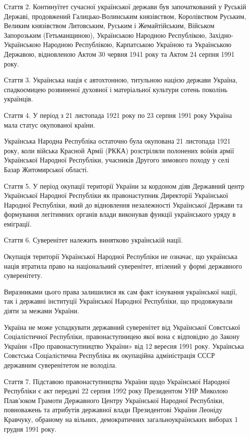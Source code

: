 Стаття 2. Континуїтет сучасної української держави був започаткований у Руській
Державі, продовжений Галицько-Волинським князівством, Королівством Руським,
Великим князівством Литовським, Руським і Жемайтійським, Військом Запорозьким
(Гетьманщиною), Українською Народною Республікою, Західно-Українською Народною
Республікою, Карпатською Україною та Українською Державою, відновленою Актом 30
червня 1941 року та Актом 24 серпня 1991 року.

Стаття 3. Українська нація є автохтонною, титульною нацією держави Україна,
спадкоємицею розвиненої духовної і матеріальної культури сотень поколінь
українців.

Стаття 4. У період з 21 листопада 1921 року по 23 серпня 1991 року Україна мала статус окупованої країни.

Українська Народна Республіка остаточно була окупована 21 листопада 1921 року,
коли війська Красной Армії (РККА) розстріляли полонених воїнів армії
Української Народної Республіки, учасників Другого зимового походу у селі Базар
Житомирської області.

Стаття 5. У період окупації території України за кордоном діяв Державний центр
Української Народної Республіки як правонаступник Директорії Української
Народної Республіки, який до відновлення незалежності Української Держави та
формування легітимних органів влади виконував функції українського уряду в
еміграції.

Стаття 6. Суверенітет належить винятково українській нації.

Окупація території Української Народної Республіки не означає, що українська
нація втратила право на національний суверенітет, втілений у формі державного
суверенітету.

Виразниками цього права залишилися як сам факт існування української нації, так
і державні інституції Української Народної Республіки, що продовжували діяти за
межами України.

Україна не може успадкувати державний суверенітет від Української Совєтської
Соціалістичної Республіки, правонаступницею якої вона є відповідно до Закону
України «Про правонаступництво України» від 12 вересня 1991 року. Українська
Совєтська Соціалістична Республіка як окупаційна адміністрація СССР державним
суверенітетом не володіла.

Стаття 7. Підставою правонаступництва України щодо Української Народної
Республіки є акт передачі 22 серпня 1992 року Президентом УНР Миколою Плав’юком
Грамоти Державного Центру Української Народної Республіки, повноважень та
атрибутів державної влади Президентові України Леоніду Кравчуку, обраному на
вільних, демократичних загальноукраїнських виборах 1 грудня 1991 року.

